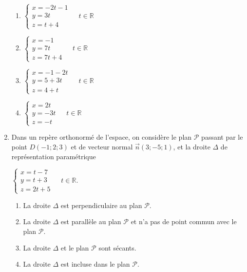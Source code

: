 \begin{enumerate}
     \begin{enumerate}[label=\alph*.]
          \item
          $\left\{ \begin{matrix}  x=-2t-1 \\  y=3t  \\  z=t+4  \end{matrix}\right.$ ~ $ t\in \mathbb{R}$
               \item
               $\left\{ \begin{matrix}  x=-1 \\ y=7t \\ z=7t+4   \end{matrix}\right.$ ~ $ t\in \mathbb{R}$
                    \item
                    $\left\{ \begin{matrix}  x=-1-2t \\ y=5+3t \\ z=4+t   \end{matrix}\right.$ ~ $ t\in \mathbb{R}$
                         \item
                         $\left\{ \begin{matrix}  x=2t \\ y=-3t \\ z=-t   \end{matrix}\right.$ ~ $ t\in \mathbb{R}$
                         \end{enumerate}
                         \item
                         Dans un repère orthonormé de l'espace, on considère le plan $\mathscr P$ passant par le point $D\left(-1;2;3\right)$ et de vecteur normal $\vec{n}\left(3;-5;1\right)$, et la droite $\Delta $ de représentation paramétrique
                         \par
                         $\left\{ \begin{matrix}  x=t-7  \\  y=t+3  \\  z=2t+5  \end{matrix}\right.$  ~ $  t \in \mathbb{R}$.
                              \begin{enumerate}[label=\alph*.]
                                   \item
                                   La droite $\Delta $ est perpendiculaire au plan $\mathscr P$.
                                   \item
                                   La droite $\Delta $ est parallèle au plan $\mathscr P$ et n'a pas de point commun avec le plan $\mathscr P$.
                                   \item
                                   La droite $\Delta $ et le plan $\mathscr P$ sont sécants.
                                   \item
                              La droite $\Delta $ est incluse dans le plan $\mathscr P$.\end{enumerate}
                         \end{enumerate}
